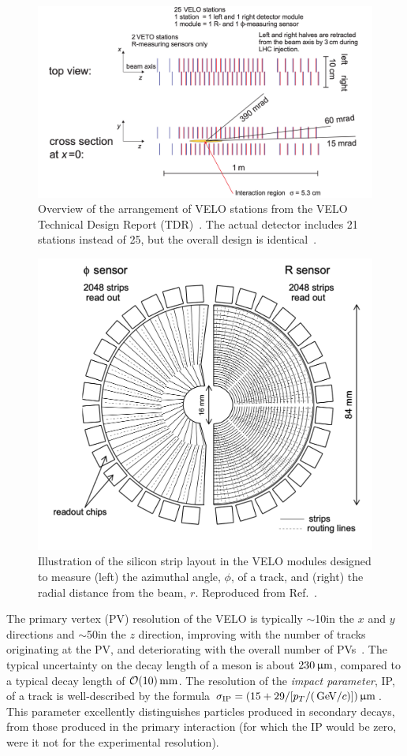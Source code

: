 \begin{figure}[tbp]
    \centering
    \includegraphics[width=0.95\columnwidth]{figures/detector/VELO_stations.png}
    \caption{Overview of the arrangement of VELO stations from the VELO Technical Design Report (TDR)~\cite{VELO-TDR}. The actual detector includes 21 stations instead of 25, but the overall design is identical~\cite{VELO-Performance}.}
    \label{fig:VELO_stations}
\end{figure}

\begin{figure}[tb]
    \centering
    \includegraphics[width=0.55\columnwidth]{figures/detector/VELO_sensors.png}
    \caption{Illustration of the silicon strip layout in the VELO modules designed to measure (left) the azimuthal angle, $\phi$, of a track, and (right) the radial distance from the beam, $r$. Reproduced from Ref.~\cite{VELO-TDR}.}
    \label{fig:VELO_sensors}
\end{figure}

The primary vertex (PV) resolution of the VELO is typically $\sim $10\mum in the $x$ and $y$ directions and $\sim$50\mum in the $z$ direction, improving with the number of tracks originating at the PV, and deteriorating with the overall number of PVs~\cite{VELO-Performance}. The typical uncertainty on the decay length of a \B meson is about $230\,\upmu\text{m}$, compared to a typical decay length of $\mathcal O(10)\text{\,mm}$. The resolution of the \emph{impact parameter}, IP, of a track is well-described by the formula $\sigma_\mathrm{IP}=(15+29/[p_T/(\text{\,Ge\kern -0.1em V}/c)])\,\upmu\text{m}$. This parameter excellently distinguishes particles produced in secondary decays, from those produced in the primary interaction (for which the IP would be zero, were it not for the experimental resolution).

